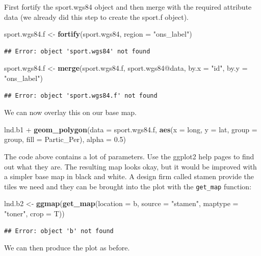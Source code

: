 \documentclass[]{article}
\newenvironment{Shaded}{}{}
\newcommand{\KeywordTok}[1]{\textcolor[rgb]{0.00,0.44,0.13}{\textbf{{#1}}}}
\newcommand{\DataTypeTok}[1]{\textcolor[rgb]{0.56,0.13,0.00}{{#1}}}
\newcommand{\FloatTok}[1]{\textcolor[rgb]{0.25,0.63,0.44}{{#1}}}
\newcommand{\StringTok}[1]{\textcolor[rgb]{0.25,0.44,0.63}{{#1}}}
\newcommand{\NormalTok}[1]{{#1}}
\begin{document}
First fortify the sport.wgs84 object and then merge with the required
attribute data (we already did this step to create the sport.f object).

\begin{Shaded}
\begin{Highlighting}[]
\NormalTok{sport.wgs84.f <- }\KeywordTok{fortify}\NormalTok{(sport.wgs84, }\DataTypeTok{region =} \StringTok{"ons_label"}\NormalTok{)}
\end{Highlighting}
\end{Shaded}
\begin{verbatim}
## Error: object 'sport.wgs84' not found
\end{verbatim}
\begin{Shaded}
\begin{Highlighting}[]
\NormalTok{sport.wgs84.f <- }\KeywordTok{merge}\NormalTok{(sport.wgs84.f, sport.wgs84@data, }\DataTypeTok{by.x =} \StringTok{"id"}\NormalTok{, }\DataTypeTok{by.y =} \StringTok{"ons_label"}\NormalTok{)}
\end{Highlighting}
\end{Shaded}
\begin{verbatim}
## Error: object 'sport.wgs84.f' not found
\end{verbatim}
We can now overlay this on our base map.

\begin{Shaded}
\begin{Highlighting}[]
\NormalTok{lnd.b1 + }\KeywordTok{geom_polygon}\NormalTok{(}\DataTypeTok{data =} \NormalTok{sport.wgs84.f, }\KeywordTok{aes}\NormalTok{(}\DataTypeTok{x =} \NormalTok{long, }\DataTypeTok{y =} \NormalTok{lat, }\DataTypeTok{group =} \NormalTok{group, }
    \DataTypeTok{fill =} \NormalTok{Partic_Per), }\DataTypeTok{alpha =} \FloatTok{0.5}\NormalTok{)}
\end{Highlighting}
\end{Shaded}
The code above contains a lot of parameters. Use the ggplot2 help pages
to find out what they are. The resulting map looks okay, but it would be
improved with a simpler base map in black and white. A design firm
called stamen provide the tiles we need and they can be brought into the
plot with the \texttt{get\_map} function:

\begin{Shaded}
\begin{Highlighting}[]
\NormalTok{lnd.b2 <- }\KeywordTok{ggmap}\NormalTok{(}\KeywordTok{get_map}\NormalTok{(}\DataTypeTok{location =} \NormalTok{b, }\DataTypeTok{source =} \StringTok{"stamen"}\NormalTok{, }\DataTypeTok{maptype =} \StringTok{"toner"}\NormalTok{, }
    \DataTypeTok{crop =} \NormalTok{T))}
\end{Highlighting}
\end{Shaded}
\begin{verbatim}
## Error: object 'b' not found
\end{verbatim}
We can then produce the plot as before.
\end{document}
